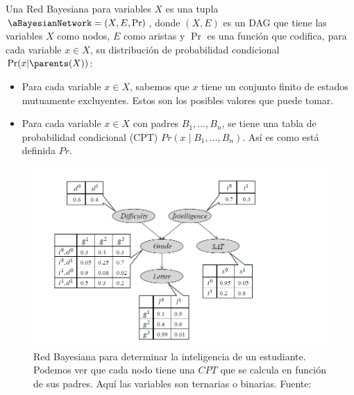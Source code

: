 
\begin{definition}
Una Red Bayesiana para variables \(X\) es una tupla \(\aBayesianNetwork = (X, E, \Pr)\), donde \((X, E)\) es un DAG que tiene las variables \(X\) como nodos, $E$ como aristas y \(\Pr\) es una función que codifica, para cada variable \(x \in X\), su distribución de probabilidad condicional \(\Pr(x | \parents(X))\):

\begin{itemize}
    \item Para cada variable $x \in X$, sabemos que $x$ tiene un conjunto finito de estados mutuamente excluyentes. Estos son los posibles valores que puede tomar.
    \item Para cada variable $x \in X$ con padres $B_1, \dots, B_n$, se tiene una tabla de probabilidad condicional (CPT) $Pr(x \mid B_1, \dots, B_n)$. Así es como está definida $Pr$.
\end{itemize}
    
\end{definition}

\begin{figure}[ht]
    \centering
    \includegraphics[scale=0.4]{img/bayesianNetworks/bayesianNetworks.png}
    \caption{Red Bayesiana para determinar la inteligencia de un estudiante. Podemos ver que cada nodo tiene una $CPT$ que se calcula en función de sus padres. Aquí las variables son ternarias o binarias. Fuente: \cite{probabilisticGraphicalModels}}
    \label{fig:bayesian_network_example}
\end{figure}

